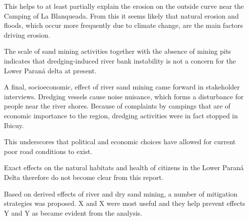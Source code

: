 This helps to at least partially explain the erosion on the outside curve near the Camping of La Blanqueada. From this it seems likely that natural erosion and floods, which occur more frequently due to climate change, are the main factors driving erosion.

The scale of sand mining activities together with the absence of mining pits indicates that dredging-induced river bank instability is not a concern for the Lower Paraná delta at present.

 A final, socioeconomic, effect of river sand mining came forward in stakeholder interviews. Dredging vessels cause noise nuisance, which forms a disturbance for people near the river shores. Because of complaints by campings that are of economic importance to the region, dredging activities were in fact stopped in Ibicuy.


This underscores that political and economic choices have allowed for current poor road conditions to exist.

Exact effects on the natural habitats and health of citizens in the Lower Paraná Delta therefore do not become clear from this report.

Based on derived effects of river and dry sand mining, a number of mitigation strategies was proposed. X and X were most useful and they help prevent effects Y and Y as became evident from the analysis.

